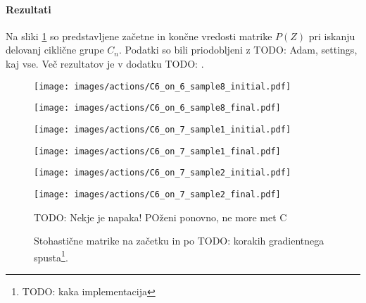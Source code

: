 \documentclass[mat2, tisk]{fmfdelo}
\newcommand{\TODO}[1]{{\color{blue} TODO: #1}}
\begin{document}
              \paragraph{Rezultati}
              Na sliki \ref{fig:actions-cn} so predstavljene začetne
              in končne vredosti matrike $P(Z)$ pri iskanju delovanj
              ciklične grupe $C_n$. Podatki so bili priodobljeni z
              \TODO{Adam, settings, kaj vse}. Več rezultatov je v
              dodatku \TODO{}.
              \begin{figure}[h!]
                \centering
                \begin{minipage}{0.49\textwidth}
                  \centering
                  \texttt{[image: images/actions/C6\_on\_6\_sample8\_initial.pdf]}
                  \caption*{$n=6, m=6$}
                \end{minipage}
                \begin{minipage}{0.49\textwidth}
                  \centering
                  \texttt{[image: images/actions/C6\_on\_6\_sample8\_final.pdf]}
                  \caption*{Model konvergira k $(154)(236)$.}
                \end{minipage}
                \vspace{0.5em}
                \centering
                \begin{minipage}{0.49\textwidth}
                  \centering
                  \texttt{[image: images/actions/C6\_on\_7\_sample1\_initial.pdf]}
                  \caption*{$n=6, m=7$}
                \end{minipage}
                \begin{minipage}{0.49\textwidth}
                  \centering
                  \texttt{[image: images/actions/C6\_on\_7\_sample1\_final.pdf]}
                  \caption*{Model konvergira k $(137)(456)$.}
                \end{minipage}
                \vspace{0.5em}
                \centering
                \begin{minipage}{0.49\textwidth}
                  \centering
                  \texttt{[image: images/actions/C6\_on\_7\_sample2\_initial.pdf]}
                  \caption*{$n=6, m=7$}
                \end{minipage}
                \begin{minipage}{0.49\textwidth}
                  \centering
                  \texttt{[image: images/actions/C6\_on\_7\_sample2\_final.pdf]}
                  \caption*{Model konvergira k izrojeni preslikavi.}
                \end{minipage}
                \caption[Stohastične matrike na začetku in po \TODO
                korakih gradientnega spusta.]{Stohastične matrike na
                  začetku in po \TODO korakih gradientnega
                spusta\footnote{\TODO kaka implementacija}.}
                \TODO{Nekje je napaka! POženi ponovno, ne more met C}
                \label{fig:actions-cn}
              \end{figure}
\end{document}
